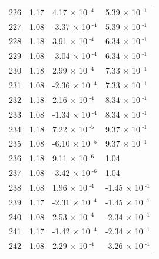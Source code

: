 \documentclass[a4paper,11pt]{article}
\begin{document}
\begin{center}
\begin{longtable}{|R{1.5cm}|R{2.5cm}|R{2.5cm}|R{2.5cm}|}
  226 &   1.17  &         4.17 $\times$ 10$^{\text{          -4}}$  &         5.39 $\times$ 10$^{\text{          -1}}$ \\ 
  227 &   1.08  &        -3.37 $\times$ 10$^{\text{          -4}}$  &         5.39 $\times$ 10$^{\text{          -1}}$ \\ 
  228 &   1.18  &         3.91 $\times$ 10$^{\text{          -4}}$  &         6.34 $\times$ 10$^{\text{          -1}}$ \\ 
  229 &   1.08  &        -3.04 $\times$ 10$^{\text{          -4}}$  &         6.34 $\times$ 10$^{\text{          -1}}$ \\ 
  230 &   1.18  &         2.99 $\times$ 10$^{\text{          -4}}$  &         7.33 $\times$ 10$^{\text{          -1}}$ \\ 
  231 &   1.08  &        -2.36 $\times$ 10$^{\text{          -4}}$  &         7.33 $\times$ 10$^{\text{          -1}}$ \\ 
  232 &   1.18  &         2.16 $\times$ 10$^{\text{          -4}}$  &         8.34 $\times$ 10$^{\text{          -1}}$ \\ 
  233 &   1.08  &        -1.34 $\times$ 10$^{\text{          -4}}$  &         8.34 $\times$ 10$^{\text{          -1}}$ \\ 
  234 &   1.18  &         7.22 $\times$ 10$^{\text{          -5}}$  &         9.37 $\times$ 10$^{\text{          -1}}$ \\ 
  235 &   1.08  &        -6.10 $\times$ 10$^{\text{          -5}}$  &         9.37 $\times$ 10$^{\text{          -1}}$ \\ 
  236 &   1.18  &         9.11 $\times$ 10$^{\text{          -6}}$  &   1.04 \\ 
  237 &   1.08  &        -3.42 $\times$ 10$^{\text{          -6}}$  &   1.04 \\ 
  238 &   1.08  &         1.96 $\times$ 10$^{\text{          -4}}$  &        -1.45 $\times$ 10$^{\text{          -1}}$ \\ 
  239 &   1.17  &        -2.31 $\times$ 10$^{\text{          -4}}$  &        -1.45 $\times$ 10$^{\text{          -1}}$ \\ 
  240 &   1.08  &         2.53 $\times$ 10$^{\text{          -4}}$  &        -2.34 $\times$ 10$^{\text{          -1}}$ \\ 
  241 &   1.17  &        -1.42 $\times$ 10$^{\text{          -4}}$  &        -2.34 $\times$ 10$^{\text{          -1}}$ \\ 
  242 &   1.08  &         2.29 $\times$ 10$^{\text{          -4}}$  &        -3.26 $\times$ 10$^{\text{          -1}}$ \\ 

\end{longtable}
\end{center}
\end{document}
